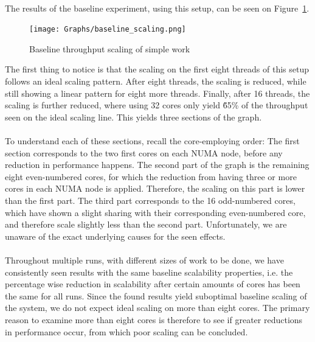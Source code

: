 \documentclass[11pt]{report} %
\begin{document}
\\
The results of the baseline experiment, using this setup, can be seen on Figure~\ref{fig:baseline_scaling}.
\begin{figure}[H]
  \centering
  \texttt{[image: Graphs/baseline\_scaling.png]}
  \caption{Baseline throughput scaling of simple work}
  \label{fig:baseline_scaling}
\end{figure}
\noindent
The first thing to notice is that the scaling on the first eight threads of this setup follows an ideal scaling pattern. After eight threads, the scaling is reduced, while still showing a linear pattern for eight more threads. Finally, after 16 threads, the scaling is further reduced, where using 32 cores only yield \~65\% of the throughput seen on the ideal scaling line. This yields three sections of the graph. \\
\\
To understand each of these sections, recall the core-employing order: The first section corresponds to the two first cores on each NUMA node, before any reduction in performance happens. The second part of the graph is the remaining eight even-numbered cores, for which the reduction from having three or more cores in each NUMA node is applied. Therefore, the scaling on this part is lower than the first part. The third part corresponds to the 16 odd-numbered cores, which have shown a slight sharing with their corresponding even-numbered core, and therefore scale slightly less than the second part. Unfortunately, we are unaware of the exact underlying causes for the seen effects.\\
\\
Throughout multiple runs, with different sizes of work to be done, we have consistently seen results with the same baseline scalability properties, i.e. the percentage wise reduction in scalability after certain amounts of cores has been the same for all runs. Since the found results yield suboptimal baseline scaling of the system, we do not expect ideal scaling on more than eight cores. The primary reason to examine more than eight cores is therefore to see if greater reductions in performance occur, from which poor scaling can be concluded.
\end{document}
